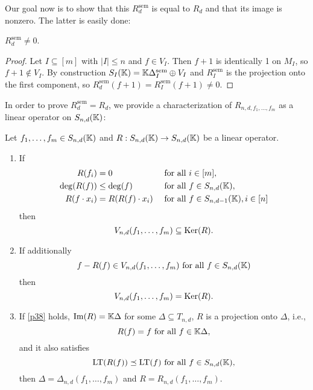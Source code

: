 \documentclass{article}
\newcommand{\Snd}{S_{n, d}(\KK)}
\newcommand{\LT}{\operatorname{LT}}
\newcommand{\Rsem}{R^\mathrm{sem}}
\newcommand{\Dsem}{\Delta^\mathrm{sem}}
\newcommand{\fa}{\text{ for all }}
\begin{document}
Our goal now is to show that this $\Rsem_d$ is equal to $R_d$ and that its image is nonzero. The latter is easily done:
\begin{lemma}
    $\Rsem_d \neq 0$.
\end{lemma}
\begin{proof}
    Let $I \subseteq [m]$ with $|I| \leq n$ and $f \in V_I$. Then $f + 1$ is identically 1 on $M_I$, so $f + 1 \not\in V_I$. By construction $S_I(\KK) = \KK \Dsem_I \oplus V_I$ and $\Rsem_I$ is the projection onto the first component, so $\Rsem_d(f + 1) = \Rsem_I(f + 1) \neq 0$.
\end{proof}

In order to prove $\Rsem_d = R_d$, we provide a characterization of $R_{n, d, f_1, \ldots, f_m}$ as a linear operator on $\Snd$:
\begin{theorem} \label{charR}
    Let $f_1, \ldots, f_m \in \Snd$ and $R: \Snd \to \Snd$ be a linear operator.

    \begin{enumerate}
        \item If
            \begin{align}
                R(f_i) &= 0 &&\fa i \in [m], \label{p34}\\
                \deg(R(f)) &\leq \deg(f) &&\fa f \in \Snd, \label{p35}\\
                R(f \cdot x_i) &= R(R(f) \cdot x_i) &&\fa f \in S_{n, d-1}(\KK), i \in [n] \label{p36}
            \end{align}
            then
            \begin{equation*}
                V_{n, d}(f_1, \ldots, f_m) \subseteq \operatorname{Ker}(R).
            \end{equation*}
        \item If additionally
            \begin{equation}
                f - R(f) \in V_{n, d}(f_1, \ldots, f_m) \fa f \in \Snd \label{p37}
            \end{equation}
            then
            \begin{equation}
                V_{n, d}(f_1, \ldots, f_m) = \operatorname{Ker}(R). \label{p38}
            \end{equation}
        \item If \eqref{p38} holds, $\operatorname{Im}(R) = \mathbb{K}\Delta$ for some $\Delta \subseteq T_{n, d}$, $R$ is a projection onto $\Delta$, i.e.,
        \begin{equation}
            R(f) = f \fa f \in \KK \Delta, \label{p39}
        \end{equation}
        and it also satisfies
        \begin{equation}
            \LT(R(f)) \preceq \LT(f) \fa f \in \Snd, \label{p310}
        \end{equation}
        then $\Delta = \Delta_{n, d}(f_1, \ldots, f_m)$ and $R = R_{n, d}(f_1, \ldots, f_m)$.
    \end{enumerate}
\end{theorem}
\end{document}
